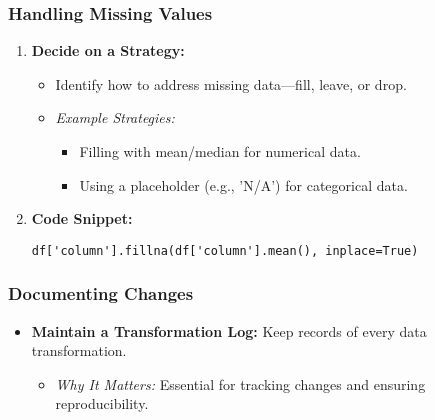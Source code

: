 \documentclass[aspectratio=169]{beamer}
\begin{document}
\begin{frame}[fragile]
    \frametitle{Handling Missing Values}
    \begin{enumerate}
        \item \textbf{Decide on a Strategy:}
        \begin{itemize}
            \item Identify how to address missing data—fill, leave, or drop.
            \item \textit{Example Strategies:}
            \begin{itemize}
                \item Filling with mean/median for numerical data.
                \item Using a placeholder (e.g., 'N/A') for categorical data.
            \end{itemize}
        \end{itemize}

        \item \textbf{Code Snippet:}
        \begin{lstlisting}
df['column'].fillna(df['column'].mean(), inplace=True)
        \end{lstlisting}
    \end{enumerate}
\end{frame}

\begin{frame}[fragile]
    \frametitle{Documenting Changes}
    \begin{itemize}
        \item \textbf{Maintain a Transformation Log:} Keep records of every data transformation.
        \begin{itemize}
            \item \textit{Why It Matters:} Essential for tracking changes and ensuring reproducibility.
        \end{itemize}
    \end{itemize}
\end{frame}
\end{document}

